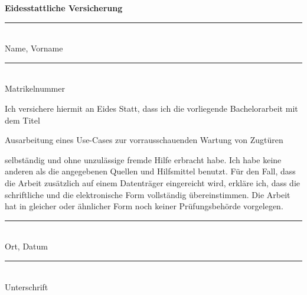 








\begin{center}
	\textbf{Eidesstattliche Versicherung}
\end{center}
\vspace{2cm}

\parbox{7cm}{\rule{7cm}{1pt}\\Name, Vorname}
\hfill 
\parbox{7cm}{\rule{7cm}{1pt}\\Matrikelnummer}
\vspace{1cm}

Ich versichere hiermit an Eides Statt, dass ich die vorliegende Bachelorarbeit mit dem Titel

\glqq Ausarbeitung eines Use-Cases zur vorrausschauenden Wartung von Zugtüren\grqq

selbständig und ohne unzulässige fremde Hilfe erbracht habe. Ich habe keine anderen als
die angegebenen Quellen und Hilfsmittel benutzt. Für den Fall, dass die Arbeit zusätzlich auf
einem Datenträger eingereicht wird, erkläre ich, dass die schriftliche und die elektronische
Form vollständig übereinstimmen. Die Arbeit hat in gleicher oder ähnlicher Form noch keiner
Prüfungsbehörde vorgelegen.

\vspace{2cm}
\parbox{7cm}{\rule{7cm}{1pt}\\Ort, Datum}
\hfill 
\parbox{7cm}{\rule{7cm}{1pt}\\Unterschrift}
\clearpage